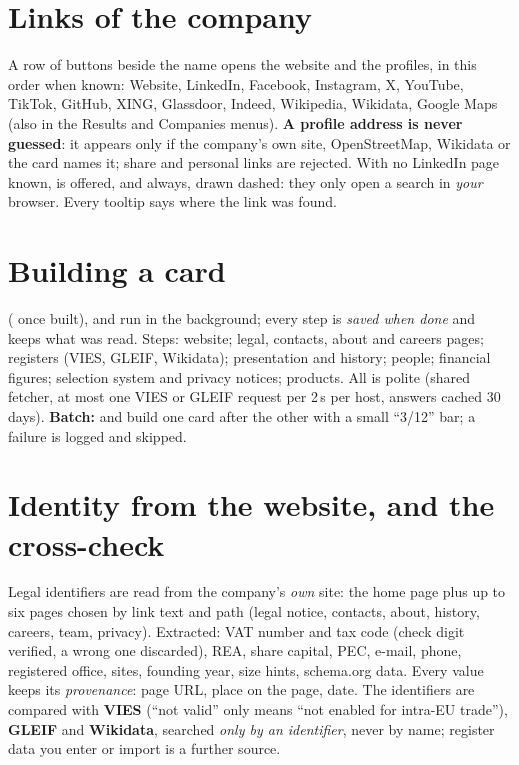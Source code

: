 \section{Links of the company}\label{sec:links}
A row of buttons beside the name opens the website and the profiles, in this order when known: Website, LinkedIn,
Facebook, Instagram, X, YouTube, TikTok, GitHub, XING, Glassdoor, Indeed, Wikipedia, Wikidata, Google Maps (also
 in the Results and Companies menus). \textbf{A profile address is never guessed}: it
appears only if the company's own site, OpenStreetMap, Wikidata or the card names it; share and personal links are
rejected. With no LinkedIn page known,  is offered, and  always,
drawn dashed: they only open a search in \emph{your} browser. Every tooltip says where the link was found.

\section{Building a card}
 ( once built),  and  run in the
background; every step is \emph{saved when done} and  keeps what was read. Steps: website; legal, contacts,
about and careers pages; registers (VIES, GLEIF, Wikidata); presentation and history; people; financial figures;
selection system and privacy notices; products. All is polite (shared fetcher, at most one VIES or GLEIF request per
2\,s per host, answers cached 30 days). \textbf{Batch:}  and  build one card after the other with a small ``3/12'' bar; a failure is logged and skipped.

\section{Identity from the website, and the cross-check}
Legal identifiers are read from the company's \emph{own} site: the home page plus up to six pages chosen by link text
and path (legal notice, contacts, about, history, careers, team, privacy). Extracted: VAT number and tax code (check
digit verified, a wrong one discarded), REA, share capital, PEC, e-mail, phone, registered office, sites, founding
year, size hints, schema.org data. Every value keeps its \emph{provenance}: page URL, place on the page, date. The
identifiers are compared with \textbf{VIES} (``not valid'' only means ``not enabled for intra-EU trade''),
\textbf{GLEIF} and \textbf{Wikidata}, searched \emph{only by an identifier}, never by name; register data you enter or
import is a further source.

